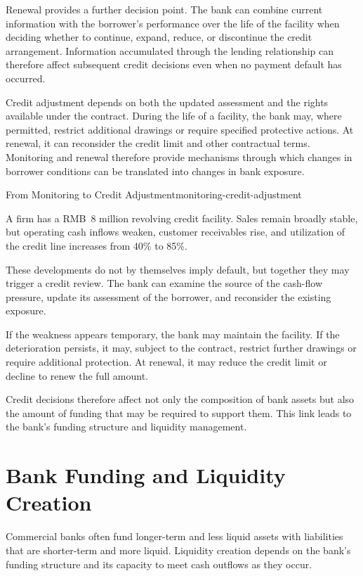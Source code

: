 Renewal provides a further decision point. The bank can combine current information with the borrower's performance over the life of the facility when deciding whether to continue, expand, reduce, or discontinue the credit arrangement. Information accumulated through the lending relationship can therefore affect subsequent credit decisions even when no payment default has occurred.

Credit adjustment depends on both the updated assessment and the rights available under the contract. During the life of a facility, the bank may, where permitted, restrict additional drawings or require specified protective actions. At renewal, it can reconsider the credit limit and other contractual terms. Monitoring and renewal therefore provide mechanisms through which changes in borrower conditions can be translated into changes in bank exposure.

\begin{example}{From Monitoring to Credit Adjustment}{monitoring-credit-adjustment}

A firm has a RMB~8 million revolving credit facility. Sales remain broadly stable, but operating cash inflows weaken, customer receivables rise, and utilization of the credit line increases from 40\% to 85\%. 

These developments do not by themselves imply default, but together they may trigger a credit review. The bank can examine the source of the cash-flow pressure, update its assessment of the borrower, and reconsider the existing exposure.

If the weakness appears temporary, the bank may maintain the facility. If the deterioration persists, it may, subject to the contract, restrict further drawings or require additional protection. At renewal, it may reduce the credit limit or decline to renew the full amount.

\end{example}

Credit decisions therefore affect not only the composition of bank assets but also the amount of funding that may be required to support them. This link leads to the bank's funding structure and liquidity management.

\section{Bank Funding and Liquidity Creation}

Commercial banks often fund longer-term and less liquid assets with liabilities that are shorter-term and more liquid. Liquidity creation depends on the bank's funding structure and its capacity to meet cash outflows as they occur.


